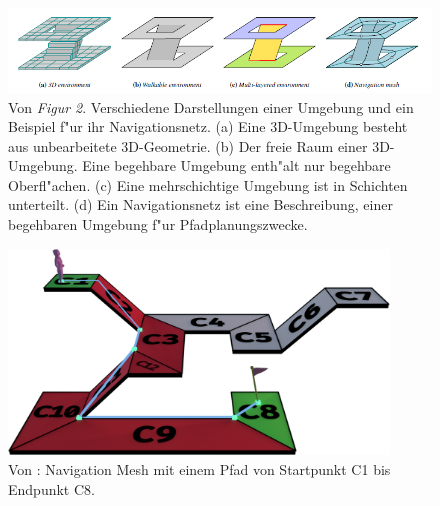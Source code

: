 \begin{figure}[H] %
	\centering
	\includegraphics[width=\textwidth]{images/navigation_mesh_16.png}
	\caption{Von \cite[~S. 93]{Mesh:16} \textit{Figur 2}. Verschiedene Darstellungen einer Umgebung und ein Beispiel f"ur ihr Navigationsnetz. (a) Eine 3D-Umgebung besteht aus unbearbeitete 3D-Geometrie. (b) Der freie Raum einer 3D-Umgebung. Eine begehbare Umgebung enth"alt nur begehbare Oberfl"achen. (c) Eine mehrschichtige Umgebung ist in Schichten unterteilt. (d) Ein Navigationsnetz ist eine Beschreibung, einer begehbaren Umgebung f"ur Pfadplanungszwecke.}
	\label{sec1a}
\end{figure}
\begin{figure}[H] %
	\centering
	\includegraphics[width=0.9\textwidth]{images/mesh_with_path.png}
	\caption{Von \cite{Mesh:18}: Navigation Mesh mit einem Pfad von Startpunkt C1 bis Endpunkt C8.}
	\label{sec1b}
\end{figure}


